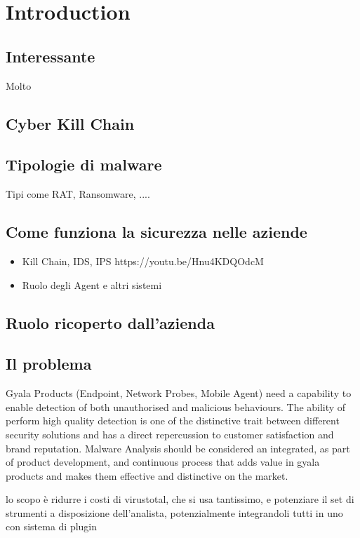 \chapter{Introduction}

\section{Interessante}
Molto \cite{aws_inforce_malware}

\section{Cyber Kill Chain}

\section{Tipologie di malware}
Tipi come RAT, Ransomware, ....

\section{Come funziona la sicurezza nelle aziende}
\begin{itemize}
    \item Kill Chain, IDS, IPS https://youtu.be/Hnu4KDQOdcM
    \item Ruolo degli Agent e altri sistemi
\end{itemize}

\section{Ruolo ricoperto dall'azienda}

\section{Il problema}
Gyala Products (Endpoint, Network Probes, Mobile Agent) need a capability to enable detection of both unauthorised and malicious behaviours.
The ability of perform high quality detection is one of the distinctive trait between different security solutions and has a direct repercussion to customer satisfaction and brand reputation.  
Malware Analysis should be considered an integrated, as part of product development, and continuous process that adds value in gyala products and makes them effective and distinctive on the market.

lo scopo è ridurre i costi di virustotal, che si usa tantissimo, e potenziare il set di strumenti a disposizione dell'analista, potenzialmente integrandoli tutti in uno con sistema di plugin